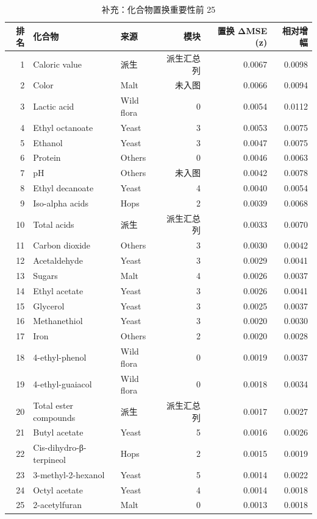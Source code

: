 \begin{table}[tbp]
\centering
\caption{补充：化合物置换重要性前 25}
\label{tab:s10_importance_top25}
\footnotesize
\setlength{\tabcolsep}{3.5pt}
\begin{tabular}{rllrrr}
\toprule
排名 & 化合物 & 来源 & 模块 & 置换 ΔMSE (z) & 相对增幅 \\
\midrule
1 & Caloric value & 派生 & 派生汇总列 & 0.0067 & 0.0098 \\
2 & Color & Malt & 未入图 & 0.0066 & 0.0094 \\
3 & Lactic acid & Wild flora & 0 & 0.0054 & 0.0112 \\
4 & Ethyl octanoate & Yeast & 3 & 0.0053 & 0.0075 \\
5 & Ethanol & Yeast & 3 & 0.0047 & 0.0075 \\
6 & Protein & Others & 0 & 0.0046 & 0.0063 \\
7 & pH & Others & 未入图 & 0.0042 & 0.0078 \\
8 & Ethyl decanoate & Yeast & 4 & 0.0040 & 0.0054 \\
9 & Iso-alpha acids & Hops & 2 & 0.0039 & 0.0068 \\
10 & Total acids & 派生 & 派生汇总列 & 0.0033 & 0.0070 \\
11 & Carbon dioxide & Others & 3 & 0.0030 & 0.0042 \\
12 & Acetaldehyde & Yeast & 3 & 0.0029 & 0.0041 \\
13 & Sugars & Malt & 4 & 0.0026 & 0.0037 \\
14 & Ethyl acetate & Yeast & 3 & 0.0026 & 0.0041 \\
15 & Glycerol & Yeast & 3 & 0.0025 & 0.0037 \\
16 & Methanethiol & Yeast & 3 & 0.0020 & 0.0030 \\
17 & Iron & Others & 2 & 0.0020 & 0.0028 \\
18 & 4-ethyl-phenol & Wild flora & 0 & 0.0019 & 0.0037 \\
19 & 4-ethyl-guaiacol & Wild flora & 0 & 0.0018 & 0.0034 \\
20 & Total ester compounds & 派生 & 派生汇总列 & 0.0017 & 0.0027 \\
21 & Butyl acetate & Yeast & 5 & 0.0016 & 0.0026 \\
22 & Cis-dihydro-β-terpineol & Hops & 2 & 0.0015 & 0.0019 \\
23 & 3-methyl-2-hexanol & Yeast & 5 & 0.0014 & 0.0022 \\
24 & Octyl acetate & Yeast & 4 & 0.0014 & 0.0018 \\
25 & 2-acetylfuran & Malt & 0 & 0.0013 & 0.0018 \\
\bottomrule
\end{tabular}
\end{table}
